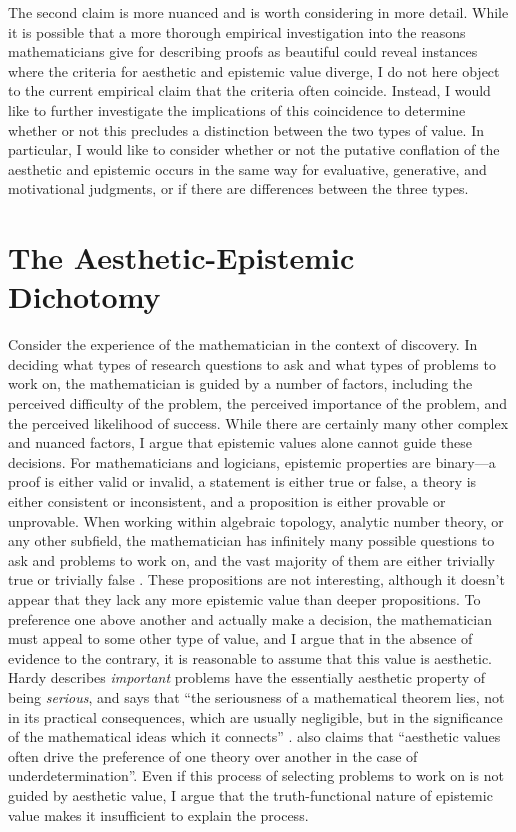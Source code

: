 \documentclass[a4paper,man,natbib]{apa6}
\begin{document}
The second claim is more nuanced and is worth considering in more detail. While it is possible that a more thorough 
empirical investigation into the reasons mathematicians give for describing proofs as beautiful could reveal instances
where the criteria for aesthetic and epistemic value diverge, I do not here object to the current empirical claim 
that the criteria often coincide. Instead, I would like to further investigate the implications of this coincidence
to determine whether or not this precludes a distinction between the two types of value. In particular, I
would like to consider whether or not the putative conflation of the aesthetic and epistemic occurs in the same
way for evaluative, generative, and motivational judgments, or if there are differences between the three types.

\section{The Aesthetic-Epistemic Dichotomy}

Consider the experience of the mathematician in the context of discovery. In deciding what types of research questions
to ask and what types of problems to work on, the mathematician is guided by a number of factors, including the
perceived difficulty of the problem, the perceived importance of the problem, and the perceived likelihood of success.
While there are certainly many other complex and nuanced factors, I argue that epistemic values alone cannot guide
these decisions. For mathematicians and logicians, epistemic properties are binary---a proof is either valid or
invalid, a statement is either true or false, a theory is either consistent or inconsistent, and a proposition
is either provable or unprovable. When working within algebraic topology, analytic number
theory, or any other subfield, the mathematician has infinitely many possible questions to ask and problems to work
on, and the vast majority of them are either trivially true or trivially false \citep[p. 324-325]{poincare_mathematical_1910}. 
These propositions are not interesting,
although it doesn't appear that they lack any more epistemic value than deeper propositions. To preference one 
above another and actually make a decision, the mathematician must appeal to some other type of value, and I argue
that in the absence of evidence to the contrary, it is reasonable to assume that this value is aesthetic. Hardy
describes \textit{important} problems have the essentially aesthetic property of being \textit{serious}, and says 
that ``the seriousness of a mathematical 
theorem lies, not in its practical consequences, which are usually negligible, but in the significance of the 
mathematical ideas which it connects'' \citep[p. 16]{hardy_mathematicians_1940}. \cite{ivanova_aesthetic_2017} 
also claims that ``aesthetic values often drive the preference of one theory over another in the case of 
underdetermination''. Even if this process of selecting problems to work on is not guided by aesthetic value, 
I argue that the truth-functional nature of epistemic value makes it insufficient to explain the process.
\end{document}
